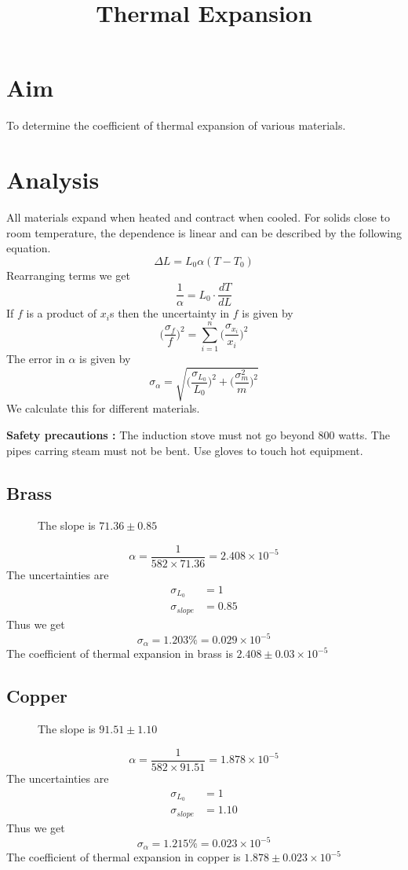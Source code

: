 \documentclass[12pt]{article}
\newlength\fwidth
\newlength\fheight
\begin{document}
\author{}
\date{}
\title{Thermal Expansion}
\maketitle
\section*{Aim}
To determine the coefficient of thermal expansion of various materials.
\section*{Analysis}
All materials expand when heated and contract when cooled.
For solids close to room temperature, the dependence is linear and can be described by the following equation.
\[\Delta L = L_0\alpha(T-T_0)\]
Rearranging terms we get
\[\frac{1}{\alpha} = L_0\cdot\frac{dT}{dL}\]
If $f$ is a product of $x_i$s then the uncertainty in $f$ is given by
\[\bigg(\frac{\sigma_f}{f}\bigg)^2=\sum_{i = 1}^{n}\bigg(\frac{\sigma_{x_i}}{x_i}\bigg)^2 \]
The error in $\alpha$ is given by
\[\sigma_\alpha = \sqrt{\bigg(\frac{\sigma_{L_0}}{L_0}\bigg)^2 +\bigg(\frac{\sigma^2_{m}}{m}\bigg)^2}\]
We calculate this for different materials.

\vspace*{7pt}

\noindent \textbf{Safety precautions :}
The induction stove must not go beyond 800 watts.
The pipes carring steam must not be bent.
Use gloves to touch hot equipment.
\subsection*{Brass}
\begin{figure}[H]
    \centering
    \setlength{}
    \setlength{}
    
    \caption{The slope is $71.36\pm0.85$}
\end{figure}
\[\alpha = \frac{1}{582\times 71.36} = 2.408\times 10^{-5}\]
The uncertainties are
\begin{align*}
    \sigma_{L_0} &= 1 \\
    \sigma_{slope} &= 0.85
\end{align*}
Thus we get
\[\sigma_\alpha = 1.203\% = 0.029\times10^{-5}\]
The coefficient of thermal expansion in brass is $2.408\pm 0.03 \times 10^{-5}$

\subsection*{Copper}
\begin{figure}[H]
    \centering
    \setlength{}
    \setlength{}
    
    \caption{The slope is $91.51\pm1.10$}
\end{figure}
\[\alpha = \frac{1}{582\times 91.51} = 1.878\times 10^{-5}\]
The uncertainties are
\begin{align*}
    \sigma_{L_0} &= 1 \\
    \sigma_{slope} &= 1.10
\end{align*}
Thus we get
\[\sigma_\alpha = 1.215\% = 0.023\times10^{-5}\]
The coefficient of thermal expansion in copper is $1.878\pm 0.023 \times 10^{-5}$
\end{document}
